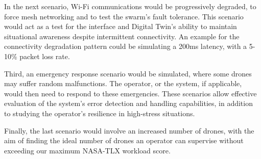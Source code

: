 In the next scenario, Wi-Fi communications would be progressively degraded, to force mesh networking and to test the swarm's fault tolerance.
This scenario would act as a test for the interface and Digital Twin's ability to maintain situational awareness despite intermittent connectivity.
An example for the connectivity degradation pattern could be simulating a 200ms latency, with a 5-10\% packet loss rate.

Third, an emergency response scenario would be simulated, where some drones may suffer random malfunctions.
The operator, or the system, if applicable, would then need to respond to these emergencies.
These scenarios allow effective evaluation of the system's error detection and handling capabilities, in addition to studying the operator's resilience in high-stress situations.

Finally, the last scenario would involve an increased number of drones, with the aim of finding the ideal number of drones an operator can supervise without exceeding our maximum NASA-TLX workload score.

